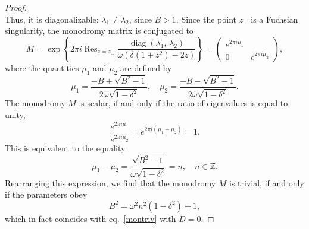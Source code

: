 \documentclass[10pt,a4paper]{amsart}
\DeclareMathOperator{\diag}{\mathrm{diag}}
\begin{document}
\begin{proof}
\begin{equation}
\end{equation}
Thus, it is diagonalizable: $\lambda_1\neq \lambda_2$, since $B>1$. 
Since the point $z_{-}$ is a Fuchsian singularity, the monodromy matrix is conjugated to 
\begin{equation}
    M = \exp\left\{2\pi i\mathop{\text{Res}}_{z=z_{-}}\frac{\diag(\lambda_1,\,\lambda_2)}{\omega(\delta(1+z^2)-2z)}\right\}=
    \begin{pmatrix}e^{2\pi i\mu_1} & \\ 0 & e^{2\pi i\mu_2}\end{pmatrix},
\end{equation}
where the quantities $\mu_1$ and $\mu_2$ are defined by
\begin{equation}
    \mu_1=\frac{-B+\sqrt{B^2-1}}{2\omega\sqrt{1-\delta^2}},\quad \mu_2=\frac{-B-\sqrt{B^2-1}}{2\omega\sqrt{1-\delta^2}}.
\end{equation}
The monodromy $M$ is scalar, if and only if the ratio of eigenvalues is equal to unity,
\begin{equation*}
    \frac{e^{2\pi i\mu_1}}{e^{2\pi i\mu_2}}=e^{2\pi i(\mu_1-\mu_2)}=1.
\end{equation*}
This is equivalent to the equality
\begin{equation}
   \mu_1-\mu_2= \frac{\sqrt{B^2-1}}{\omega\sqrt{1-\delta^2}}=n,\quad n\in\mathbb{Z}.
\end{equation}
Rearranging this expression, we find that the monodromy $M$ is trivial,  if and only if the parameters obey
\begin{equation}
    B^2=\omega^2n^2\left(1-\delta^2\right)+1,
\end{equation}
which in fact coincides with eq.~\eqref{montriv} with $D=0$.
\end{proof}
\end{document}
